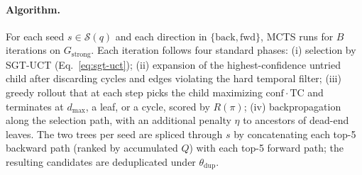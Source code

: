 \documentclass{llmxive}
\begin{document}

\paragraph{Algorithm.}
For each seed $s\in\mathcal{S}(q)$ and each direction in $\{\text{back},\text{fwd}\}$, MCTS runs for $B$
iterations on $G_{\text{strong}}$. Each iteration follows four standard phases: (i) selection by SGT-UCT
(Eq.~\ref{eq:sgt-uct}); (ii) expansion of the highest-confidence untried child after discarding cycles and edges
violating the hard temporal filter; (iii) greedy rollout that at each step picks the child maximizing
$\mathrm{conf}\cdot\mathrm{TC}$ and terminates at $d_{\max}$, a leaf, or a cycle, scored by $R(\pi)$;
(iv) backpropagation along the selection path, with an additional penalty $\eta$ to ancestors of dead-end leaves.
The two trees per seed are spliced through $s$ by concatenating each top-5 backward path (ranked by accumulated
$Q$) with each top-5 forward path; the resulting candidates are deduplicated under $\theta_{\text{dup}}$.

\end{document}
